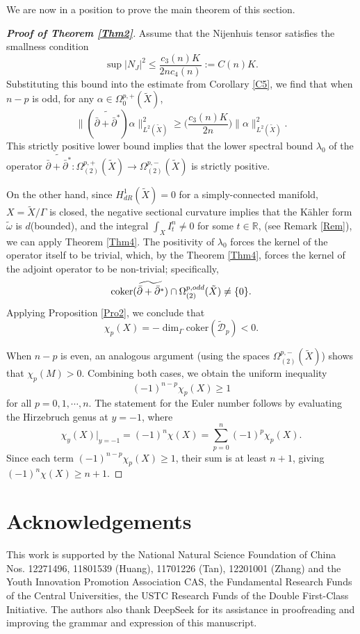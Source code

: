 \documentclass[12pt, twoside]{article}
\theoremstyle{definition}
\numberwithin{equation}{section}
\def \a {\alpha }
\def \la {\lambda}
\def\Om{\Omega}
\def\Ga{\Gamma}
\begin{document}
We are now in a position to prove the main theorem of this section.
\begin{proof}[\textbf{Proof of Theorem \ref{Thm2}}]
	Assume that the Nijenhuis tensor satisfies the smallness condition
	\[ \sup|N_{J}|^{2}\leq\frac{c_{3}(n)K}{2nc_{4}(n)}:=C(n)K.\]
	Substituting this bound into the estimate from Corollary \ref{C5}, we find that when $n-p$ is odd, for any $\a\in\Om^{p,+}_{0}(\tilde{X})$,  
	\[\|(\widetilde{\bar{\partial}+\bar{\partial}^{\ast}})\a\|^{2}_{L^{2}(\tilde{X})}
	\geq \Big(\frac{c_{3}(n)K}{2n}\Big)\|\a\|^{2}_{L^{2}(\tilde{X})}. \]
	This strictly positive lower bound implies that the lower spectral bound 
	$\la_{0}$ of the operator $ \widetilde{\bar{\partial}+\bar{\partial}^{\ast}}:\Om_{(2)}^{p,+}(\tilde{X})\rightarrow\Om_{(2)}^{p,-}(\tilde{X})$ 
	is strictly positive. 
	
	On the other hand, since $H^{1}_{dR}(\tilde{X})=0$ for a simply-connected manifold, $X=\tilde{X}/\Ga$ is closed, 
	the negative sectional curvature implies that the Kähler form \(\tilde{\omega}\) is $d$(bounded), 
	and the integral $\int_{X}I^{n}_{t}\neq 0$ for some $t\in\mathbb{R}$, (see Remark \ref{Rem}), we can apply Theorem \ref{Thm4}. The positivity of $\la_{0}$ forces the kernel of the operator itself to be trivial, which, by the Theorem \ref{Thm4}, forces the kernel of the adjoint operator to be non-trivial; specifically,
	\[{\rm{coker}}(\widetilde{\bar{\partial}+\bar{\partial}^{\ast}})\cap\Om^{p,odd}_{(2)}(\tilde{X})\neq \{0\}. \]
	Applying Proposition \ref{Pro2}, we conclude that
	\begin{equation*}	
	\chi_{p}(X)=-\dim_{\Gamma}\mathrm{coker}(\tilde{\mathcal{D}}_{p})<0.
	\end{equation*}
	
	When $n-p$ is even, an analogous argument (using the spaces $\Om^{p,-}_{(2)}(\tilde{X})$) shows that $\chi_{p}(M)>0$. 
	Combining both cases, we obtain the uniform inequality
	\[ (-1)^{n-p}\chi_{p}(X)\geq1\]
	for all $p=0,1,\cdots,n$. The statement for the Euler number follows by evaluating the Hirzebruch genus at $y=-1$, where
	\[\chi_{y}(X)|_{y=-1}=(-1)^{n}\chi(X)=\sum_{p=0}^{n}(-1)^{p}\chi_{p}(X).\]
	Since each term $(-1)^{n-p}\chi_{p}(X)\geq1$, their sum is at least $n+1$, giving $(-1)^{n}\chi(X)\geq n+1$.
\end{proof}	



	
	\section*{Acknowledgements}
	This work is supported by the National Natural Science Foundation of China Nos. 12271496, 11801539 (Huang), 11701226 (Tan), 12201001 (Zhang) and the Youth Innovation Promotion Association CAS, the Fundamental Research Funds of the Central Universities, the USTC Research Funds of the Double First-Class Initiative. The authors also thank DeepSeek for its assistance in proofreading and improving the grammar and expression of this manuscript.
	
\end{document}
